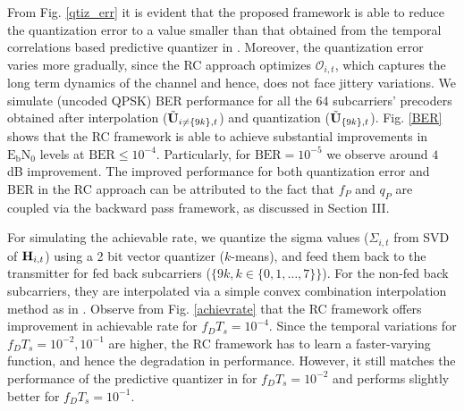 \documentclass[conference]{IEEEtran}
\begin{document}
{From Fig. \ref{qtiz_err} it is evident that the proposed framework is
able to reduce the quantization error to a value smaller than that
obtained from the temporal correlations based predictive quantizer in
\cite{6891198}. Moreover, the quantization error varies more
gradually, since the RC approach optimizes $\mathcal{O}_{i,t}$, which
captures the long term dynamics of the channel and hence, does not
face jittery variations. We simulate (uncoded QPSK) BER performance
for all the 64 subcarriers' precoders obtained after interpolation
($\tilde{{\bf U}}_{i\neq\{9k\},t}$) and quantization
($\tilde{{\bf U}}_{\{9k\},t}$). Fig. \ref{BER} shows that the RC framework
is able to achieve substantial improvements in
$\text{E}_\text{b}\text{N}_0$ levels at $\text{BER}\leq
10^{-4}$. Particularly, for $\text{BER}=10^{-5}$ we observe around $4$
dB improvement. The improved performance for both
quantization error and BER in the RC approach can be attributed to the
fact that $f_P$ and $q_P$ are coupled via the backward pass framework,
as discussed in Section III.

\noindent For simulating the achievable rate, we quantize the sigma values ($\Sigma_{i,t}$ from SVD of ${\bf H}_{i,t}$) using a 2 bit vector quantizer ($k$-means), and feed them back to the transmitter for fed back subcarriers ($\{9k, k \in \{0,1,\ldots,7\}\}$). For the non-fed back subcarriers, they are interpolated via a simple convex combination interpolation method as in \cite{Gupt1905:Predictive}. Observe from Fig. \ref{achievrate} that the RC framework offers improvement in achievable rate for $f_DT_s=10^{-4}$. Since the temporal variations for $f_DT_s=10^{-2}, 10^{-1}$ are higher, the RC framework has to learn a faster-varying function, and hence the degradation in performance. However, it still matches the performance of the predictive quantizer in \cite{6891198} for $f_DT_s=10^{-2}$ and performs slightly better for $f_DT_s=10^{-1}$.

}
\end{document}
